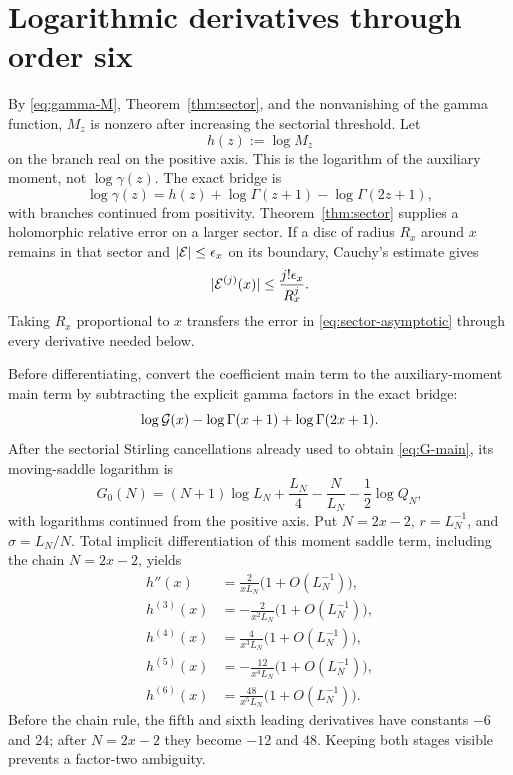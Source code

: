 \documentclass[12pt]{article}
\begin{document}
\section{Logarithmic derivatives through order six}\label{sec:derivatives}

By \eqref{eq:gamma-M}, Theorem~\ref{thm:sector}, and the nonvanishing of the
gamma function, $M_z$ is nonzero after increasing the sectorial threshold.
Let
\begin{equation}\label{eq:h-definition}
 h(z):=\log M_z
\end{equation}
on the branch real on the positive axis.  This is the logarithm of the
auxiliary moment, not $\log\gamma(z)$.  The exact bridge is
\[
 \log\gamma(z)=h(z)+\log\Gamma(z+1)-\log\Gamma(2z+1),
\]
with branches continued from positivity.  Theorem~\ref{thm:sector} supplies
a holomorphic relative error on a larger sector.  If a disc of radius $R_x$
around $x$ remains in that sector and $|\mathcal E|\le\epsilon_x$ on its boundary,
Cauchy's estimate gives
\begin{equation}\label{eq:cauchy-transport}
 |\mathcal E^{(j)}(x)|\le\frac{j!\epsilon_x}{R_x^j}.
\end{equation}
Taking $R_x$ proportional to $x$ transfers the error in
\eqref{eq:sector-asymptotic} through every derivative needed below.

Before differentiating, convert the coefficient main term to the
auxiliary-moment main term by subtracting the explicit gamma factors in the
exact bridge:
\[
 \log\mathcal G(x)-\log\Gamma(x+1)+\log\Gamma(2x+1).
\]
After the sectorial Stirling cancellations already used to obtain
\eqref{eq:G-main}, its moving-saddle logarithm is
\begin{equation}\label{eq:G0-definition}
 G_0(N)=(N+1)\log L_N+\frac{L_N}{4}-\frac{N}{L_N}
 -\frac12\log Q_N,
\end{equation}
with logarithms continued from the positive axis.  Put $N=2x-2$,
$r=L_N^{-1}$, and $\sigma=L_N/N$.  Total implicit differentiation of this
moment saddle term, including the chain $N=2x-2$, yields
\begin{align}
 h''(x)&=\frac{2}{xL_N}\bigl(1+O(L_N^{-1})\bigr),\nonumber\\
 h^{(3)}(x)&=-\frac{2}{x^2L_N}\bigl(1+O(L_N^{-1})\bigr),\nonumber\\
 h^{(4)}(x)&=\frac{4}{x^3L_N}\bigl(1+O(L_N^{-1})\bigr),\label{eq:derivative-tower}\\
 h^{(5)}(x)&=-\frac{12}{x^4L_N}\bigl(1+O(L_N^{-1})\bigr),\nonumber\\
 h^{(6)}(x)&=\frac{48}{x^5L_N}\bigl(1+O(L_N^{-1})\bigr).\nonumber
\end{align}
Before the chain rule, the fifth and sixth leading derivatives have constants
$-6$ and $24$; after $N=2x-2$ they become $-12$ and $48$.  Keeping both
stages visible prevents a factor-two ambiguity.
\end{document}
